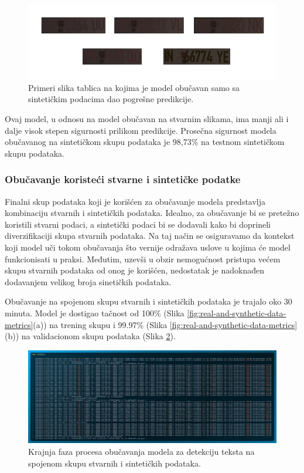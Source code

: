 \documentclass[a4paper,12pt]{article}
\begin{document}
	\begin{figure}[H]
		\centering
		\includegraphics[width=\textwidth]{assets/bad-predictions-synthetic-data-model.png}
		\caption{Primeri slika tablica na kojima je model obučavan samo sa sintetičkim podacima dao pogrešne predikcije.}
		\label{fig:bad-predictions-synthetic-data-model}
	\end{figure}
	
	Ovaj model, u odnosu na model obučavan na stvarnim slikama, ima manji ali i dalje visok stepen sigurnosti prilikom predikcije. Prosečna sigurnost modela obučavanog na sintetičkom skupu podataka je 98,73\% na testnom sintetičkom skupu podataka.
	
	\subsubsection{Obučavanje koristeći stvarne i sintetičke podatke}
	Finalni skup podataka koji je korišćen za obučavanje modela predstavlja kombinaciju stvarnih i sintetičkih podataka. Idealno, za obučavanje bi se pretežno koristili stvarni podaci, a sintetički podaci bi se dodavali kako bi doprineli diverzifikaciji skupa stvarnih podataka. Na taj način se osiguravamo da kontekst koji model uči tokom obučavanja što vernije odražava uslove u kojima će model funkcionisati u praksi. Međutim, uzevši u obzir nemogućnost pristupa većem skupu stvarnih podataka od onog je korišćen, nedostatak je nadoknađen dodavanjem velikog broja sinetičkih podataka.
	
	Obučavanje na spojenom skupu stvarnih i sintetičkih podataka je trajalo oko 30 minuta. Model je dostigao tačnost od 100\% (Slika \ref{fig:real-and-synthetic-data-metrics}(a)) na trening skupu i 99.97\% (Slika \ref{fig:real-and-synthetic-data-metrics}(b)) na validacionom skupu podataka (Slika \ref{fig:train-code-real-and-synthetic-data}).
	
	\begin{figure}[H]
		\centering
		\includegraphics[width=\textwidth]{assets/train-code-real-and-synthetic-data.png}
		\caption{Krajnja faza procesa obučavanja modela za detekciju teksta na spojenom skupu stvarnih i sintetičkih podataka.}
		\label{fig:train-code-real-and-synthetic-data}
	\end{figure}
	
\end{document}
